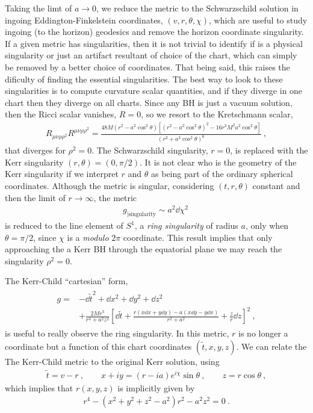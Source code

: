 Taking the limt of $a\to0$, we reduce the metric to the Schwarzschild solution in ingoing Eddington-Finkelstein coordinates, $(v,r,\theta,\chi)$, which are useful to study ingoing (to the horizon) geodesics and remove the horizon coordinate singularity. If a given metric has singularities, then it is not trivial to identify if is a physical singularity or just an artifact resultant of choice of the chart, which can simply be removed by a better choice of coordinates. 
That being said, this raises the dificulty of finding the essential singularities.
The best way to look to these singularities is to compute curvature scalar quantities, and if they diverge in one chart then they diverge on all charts.
Since any BH is just a vacuum solution, then the Ricci scalar vanishes, $R=0$, so we resort to the Kretschmann scalar,
\begin{align}
    R_{\mu\nu\rho\rho^2} R^{\mu\nu\rho\rho^2} = \frac{48 M (r^2 - a^2\cos^2\theta) \left[ (r^2 - a^2\cos^2\theta) ^2 - 16 r^2 M^2 a^2\cos^2\theta \right] }{(r^2 + a^2\cos^2\theta)^6} ~,
    \label{eq2:KerrKretschmann}
\end{align}
that diverges for $\rho^2=0$.
The Schwarzschild singularity, $r=0$, is replaced with the Kerr singularity $(r,\theta)=(0,\pi/2)$. It is not clear who is the geometry of the Kerr singularity if we interpret $r$ and $\theta$ as being part of the ordinary spherical coordinates. Although the metric is singular, considering $(t,r,\theta)$ constant and then the limit of $r\to\infty$, the metric
\begin{align}
    g_{\rvert\mathrm{singularity}} \sim a^2 \dd \chi^2 ~
    \label{eq2:KerrKretschmann}
\end{align}
is reduced to the line element of $S^1$, a \emph{ring singularity} of radius $a$, only when $\theta=\pi/2$, since $\chi$ is a \emph{modulo} $2\pi$ coordinate. This result implies that only approaching the a Kerr BH through the equatorial plane we may reach the singularity $\rho^2=0$. 

The Kerr-Child ``cartesian'' form, 
\begin{align}
    \begin{split}
        g = &- \dd \tilde{t}^2 + \dd x^2 + \dd y^2 + \dd z^2 \\
        &+ \frac{2 M r^3}{r^4 + a^2 z^2} \left[ \dd \tilde{t} + \frac{r (x \dd x + y \dd y) - a (x \dd y - y \dd x)}{r^2+a^2} + \frac{z}{r} \dd z \right]^2 ~,
    \end{split}
    \label{eq2:KerrChild}
\end{align}
is useful to really observe the ring singularity. In this metric, $r$ is no longer a coordinate but a function of this chart coordinates $(\tilde{t},x,y,z)$. We can relate the The Kerr-Child metric to the original Kerr solution, using
\begin{align}
    \tilde{t} = v - r ~, \qquad x+ i y = (r -i a) e^{i \chi} \sin\theta ~,\qquad z=r\cos\theta ~,
    \label{eq2:InEFtoKChild}
\end{align}
which implies that $r(x,y,z)$ is implicitly given by
\begin{align}
    r^4 - (x^2+y^2+z^2-a^2)r^2 -a^2 z^2 = 0 ~.
    \label{eq2:rConditionKChild}
\end{align}

